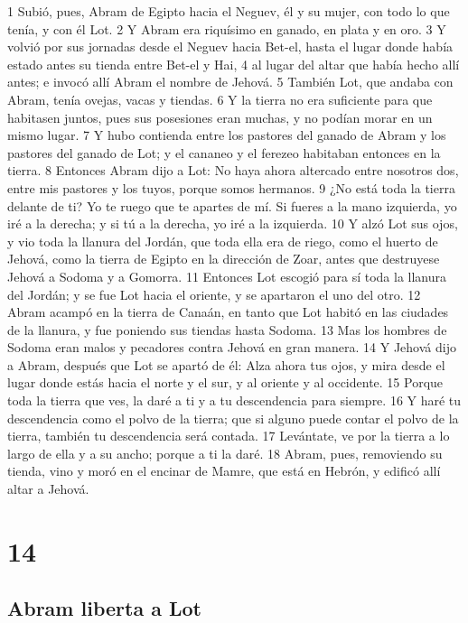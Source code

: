 1 Subió, pues, Abram de Egipto hacia el Neguev, él y su mujer, con todo lo que tenía, y con él Lot.
2 Y Abram era riquísimo en ganado, en plata y en oro.
3 Y volvió por sus jornadas desde el Neguev hacia Bet-el, hasta el lugar donde había estado antes su tienda entre Bet-el y Hai,
4 al lugar del altar que había hecho allí antes; e invocó allí Abram el nombre de Jehová.
5 También Lot, que andaba con Abram, tenía ovejas, vacas y tiendas.
6 Y la tierra no era suficiente para que habitasen juntos, pues sus posesiones eran muchas, y no podían morar en un mismo lugar.
7 Y hubo contienda entre los pastores del ganado de Abram y los pastores del ganado de Lot; y el cananeo y el ferezeo habitaban entonces en la tierra.
8 Entonces Abram dijo a Lot: No haya ahora altercado entre nosotros dos, entre mis pastores y los tuyos, porque somos hermanos.
9 ¿No está toda la tierra delante de ti? Yo te ruego que te apartes de mí. Si fueres a la mano izquierda, yo iré a la derecha; y si tú a la derecha, yo iré a la izquierda.
10 Y alzó Lot sus ojos, y vio toda la llanura del Jordán, que toda ella era de riego, como el huerto de Jehová, como la tierra de Egipto en la dirección de Zoar, antes que destruyese Jehová a Sodoma y a Gomorra.
11 Entonces Lot escogió para sí toda la llanura del Jordán; y se fue Lot hacia el oriente, y se apartaron el uno del otro.
12 Abram acampó en la tierra de Canaán, en tanto que Lot habitó en las ciudades de la llanura, y fue poniendo sus tiendas hasta Sodoma.
13 Mas los hombres de Sodoma eran malos y pecadores contra Jehová en gran manera.
14 Y Jehová dijo a Abram, después que Lot se apartó de él: Alza ahora tus ojos, y mira desde el lugar donde estás hacia el norte y el sur, y al oriente y al occidente.
15 Porque toda la tierra que ves, la daré a ti y a tu descendencia para siempre.
16 Y haré tu descendencia como el polvo de la tierra; que si alguno puede contar el polvo de la tierra, también tu descendencia será contada.
17 Levántate, ve por la tierra a lo largo de ella y a su ancho; porque a ti la daré.
18 Abram, pues, removiendo su tienda, vino y moró en el encinar de Mamre, que está en Hebrón, y edificó allí altar a Jehová.

\chapter{14}

\section{Abram liberta a Lot}

